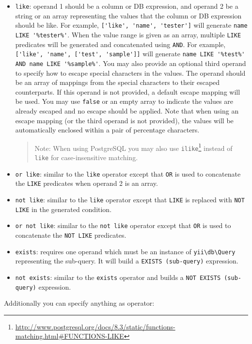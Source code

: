 \begin{itemize}
\item \lstinline|like|: operand 1 should be a column or DB expression, and operand 2 be a string or an array representing
the values that the column or DB expression should be like.
For example, \lstinline|['like', 'name', 'tester']| will generate \lstinline|name LIKE '%tester%'|.
When the value range is given as an array, multiple \lstinline|LIKE| predicates will be generated and concatenated
using \lstinline|AND|. For example, \lstinline|['like', 'name', ['test', 'sample']]| will generate
\lstinline|name LIKE '%test%' AND name LIKE '%sample%'|.
You may also provide an optional third operand to specify how to escape special characters in the values.
The operand should be an array of mappings from the special characters to their
escaped counterparts. If this operand is not provided, a default escape mapping will be used.
You may use \lstinline|false| or an empty array to indicate the values are already escaped and no escape
should be applied. Note that when using an escape mapping (or the third operand is not provided),
the values will be automatically enclosed within a pair of percentage characters.

\begin{quote}Note: When using PostgreSQL you may also use \lstinline|ilike|\footnote{\url{http://www.postgresql.org/docs/8.3/static/functions-matching.html\#FUNCTIONS-LIKE}}
instead of \lstinline|like| for case-insensitive matching.

\end{quote}

\item \lstinline|or like|: similar to the \lstinline|like| operator except that \lstinline|OR| is used to concatenate the \lstinline|LIKE|
predicates when operand 2 is an array.


\item \lstinline|not like|: similar to the \lstinline|like| operator except that \lstinline|LIKE| is replaced with \lstinline|NOT LIKE|
in the generated condition.


\item \lstinline|or not like|: similar to the \lstinline|not like| operator except that \lstinline|OR| is used to concatenate
the \lstinline|NOT LIKE| predicates.


\item \lstinline|exists|: requires one operand which must be an instance of \texttt{yii{\allowbreak{}\textbackslash}db{\allowbreak{}\textbackslash}Query} representing the sub-query.
It will build a \lstinline|EXISTS (sub-query)| expression.


\item \lstinline|not exists|: similar to the \lstinline|exists| operator and builds a \lstinline|NOT EXISTS (sub-query)| expression.


\end{itemize}
Additionally you can specify anything as operator:

